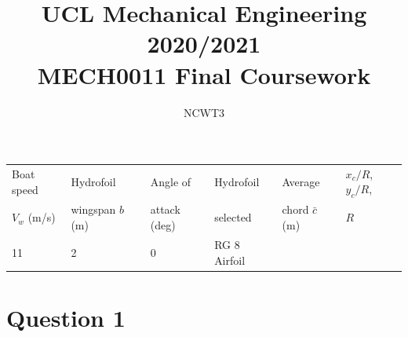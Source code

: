 \documentclass[11pt]{article}
\numberwithin{equation}{section}
\begin{document}
\title{\textbf{UCL Mechanical Engineering 2020/2021}\\MECH0011 Final Coursework}
\author{NCWT3}
\maketitle
\begin{table}[H]
    \centering
    \begin{tabular}{@{}llllll@{}}
        \toprule
        Boat speed & Hydrofoil & Angle of & Hydrofoil & Average & $x_c/R$, $y_c/R$,\\
        $V_w$ (m/s) & wingspan $b$ (m) & attack (deg) & selected & chord $\bar{c}$ (m) & $R$\\
        \midrule
        11 & 2 & 0 & RG 8 Airfoil & & \\
        \bottomrule
        \end{tabular}
\end{table}
\tableofcontents
\listoffigures
\section{Question 1}
\end{document}
